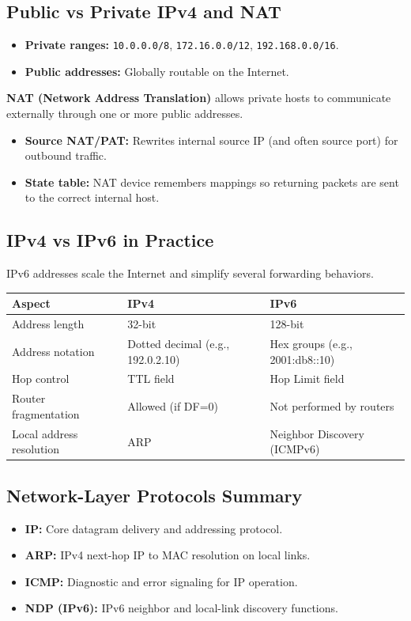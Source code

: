 \documentclass[12pt,a4paper]{article}
\begin{document}
\subsection*{Public vs Private IPv4 and NAT}
\begin{itemize}
    \item \textbf{Private ranges:} \texttt{10.0.0.0/8}, \texttt{172.16.0.0/12}, \texttt{192.168.0.0/16}.
    \item \textbf{Public addresses:} Globally routable on the Internet.
\end{itemize}
\textbf{NAT (Network Address Translation)} allows private hosts to communicate externally through one or more public addresses.
\begin{itemize}
    \item \textbf{Source NAT/PAT:} Rewrites internal source IP (and often source port) for outbound traffic.
    \item \textbf{State table:} NAT device remembers mappings so returning packets are sent to the correct internal host.
\end{itemize}

\subsection*{IPv4 vs IPv6 in Practice}
IPv6 addresses scale the Internet and simplify several forwarding behaviors.

\begin{center}
\begin{tabular}{|l|p{4.3cm}|p{4.7cm}|}
    \hline
    \textbf{Aspect} & \textbf{IPv4} & \textbf{IPv6} \\
    \hline
    Address length & 32-bit & 128-bit \\
    \hline
    Address notation & Dotted decimal (e.g., 192.0.2.10) & Hex groups (e.g., 2001:db8::10) \\
    \hline
    Hop control & TTL field & Hop Limit field \\
    \hline
    Router fragmentation & Allowed (if DF=0) & Not performed by routers \\
    \hline
    Local address resolution & ARP & Neighbor Discovery (ICMPv6) \\
    \hline
\end{tabular}
\end{center}

\subsection*{Network-Layer Protocols Summary}
\begin{itemize}
    \item \textbf{IP:} Core datagram delivery and addressing protocol.
    \item \textbf{ARP:} IPv4 next-hop IP to MAC resolution on local links.
    \item \textbf{ICMP:} Diagnostic and error signaling for IP operation.
    \item \textbf{NDP (IPv6):} IPv6 neighbor and local-link discovery functions.
\end{itemize}
\end{document}
